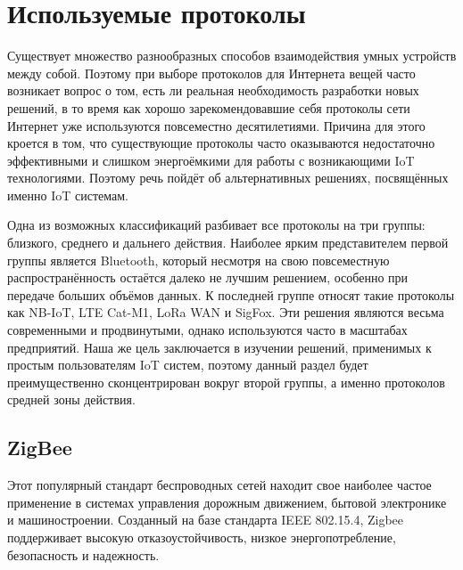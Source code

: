 	
	\section{Используемые протоколы}
	
	Существует множество разнообразных способов взаимодействия умных устройств между собой. Поэтому
	при выборе протоколов для Интернета вещей часто возникает вопрос о том, есть ли реальная необходимость
	разработки новых решений, в то время как хорошо зарекомендовавшие себя протоколы сети Интернет уже
	используются повсеместно десятилетиями. Причина для этого кроется в том, что существующие протоколы
	часто оказываются недостаточно эффективными и слишком энергоёмкими для работы с возникающими
	IoT технологиями. Поэтому речь пойдёт об альтернативных решениях, посвящённых именно IoT системам.
	
	Одна из возможных классификаций разбивает все протоколы на три группы: близкого, среднего и дальнего
	действия. Наиболее ярким представителем первой группы является Bluetooth, который несмотря на свою
	повсеместную распространённость остаётся далеко не лучшим решением, особенно при передаче больших
	объёмов данных. К последней группе относят такие протоколы как NB-IoT, LTE Cat-M1, LoRa WAN и SigFox.
	Эти решения являются весьма современными и продвинутыми, однако используются часто в масштабах
	предприятий. Наша же цель заключается в изучении решений, применимых к простым пользователям 
	IoT систем, поэтому данный раздел будет преимущественно сконцентрирован вокруг второй группы, 
	а именно протоколов средней зоны действия.
	
	
	

	\subsection{ZigBee}
	Этот популярный стандарт беспроводных сетей находит свое наиболее частое применение в системах 
	управления дорожным движением, бытовой электронике и машиностроении. Созданный на базе стандарта
	IEEE 802.15.4, Zigbee поддерживает высокую отказоустойчивость, низкое энергопотребление, безопасность
	и надежность.
	
